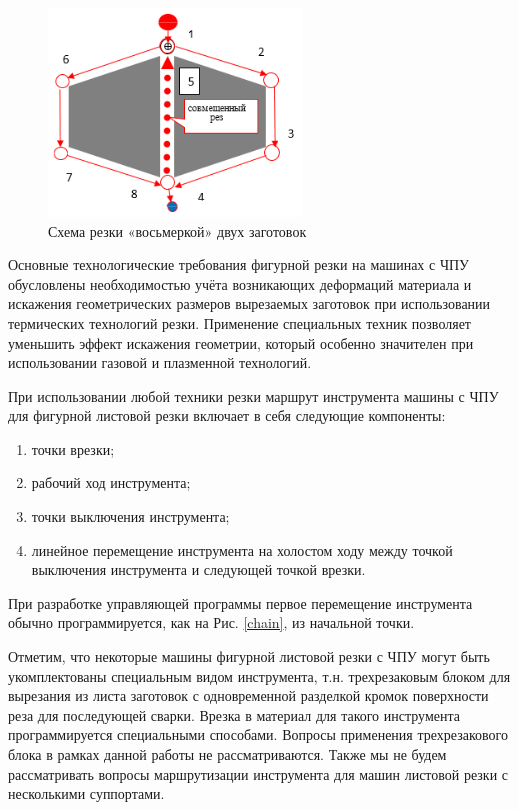 \documentclass[12pt,twoside]{report}
\begin{document}
\begin{figure}
  \begin{center}
  \includegraphics[width=0.6\textwidth]{8.png}
  \caption{Схема резки «восьмеркой» двух заготовок}
  \label{8}
  \end{center}
\end{figure}

Основные технологические требования
фигурной резки на машинах с ЧПУ обусловлены
необходимостью учёта возникающих деформаций
материала и искажения геометрических размеров
вырезаемых заготовок при использовании
термических технологий резки.
Применение специальных техник позволяет
уменьшить эффект искажения геометрии,
который особенно значителен при
использовании газовой и плазменной технологий.

При использовании любой техники резки маршрут инструмента
машины с ЧПУ для фигурной листовой резки
включает в себя следующие компоненты:
\begin{enumerate}
  \item точки врезки;
  \item рабочий ход инструмента;
  \item точки выключения инструмента;
  \item линейное перемещение инструмента на холостом ходу
  между точкой выключения инструмента и следующей точкой врезки.
\end{enumerate}

При разработке управляющей программы
первое перемещение инструмента обычно
программируется, как на Рис. \ref{chain},
из начальной точки.

Отметим, что некоторые машины фигурной листовой
резки с ЧПУ могут быть укомплектованы
специальным видом инструмента,
т.н. трехрезаковым блоком для вырезания
из листа заготовок с одновременной разделкой
кромок поверхности реза для последующей сварки.
Врезка в материал для такого инструмента
программируется специальными способами.
Вопросы применения трехрезакового блока
в рамках данной работы не рассматриваются.
Также мы не будем рассматривать вопросы
маршрутизации инструмента для машин
листовой резки с несколькими суппортами.
\end{document}
